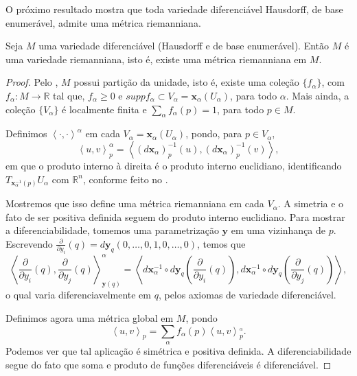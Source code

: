 O próximo resultado mostra que toda variedade diferenciável Hausdorff, de base enumerável, admite uma métrica riemanniana.
\begin{theorem}
	\label{teo:existencia-metrica}
	Seja $M$ uma variedade diferenciável (Hausdorff e de base enumerável). Então $M$ é uma variedade riemanniana, isto é, existe uma métrica riemanniana em $M$.
	\begin{proof}

		Pelo , $M$ possui partição da unidade, isto é, existe uma coleção $\{ f_{\alpha} \}$, com $f_{\alpha}:M\to \mathbb{R}$ tal que, $f_{\alpha}\geq0$ e $suppf_{\alpha}\subset V_{\alpha}=\mathbf{x}_{\alpha}(U_{\alpha})$, para todo $\alpha$. Mais ainda, a coleção $\{ V_{\alpha} \}$ é localmente finita e $\sum_{\alpha}f_{\alpha}(p)=1$, para todo $p \in M$.

		Definimos $\left<\cdot,\cdot\right>^{\alpha}$ em cada $V_{\alpha}=\mathbf{x}_{\alpha}(U_{\alpha})$, pondo, para $p \in V_{\alpha}$,
		\begin{equation*}
			\left<u,v\right>_{p}^{\alpha}=\left<(d\mathbf{x}_{\alpha})_{p}^{-1}(u),(d\mathbf{x}_{\alpha})_{p}^{-1}(v)\right>,
		\end{equation*}
		em que o produto interno à direita é o produto interno euclidiano, identificando $T_{\mathbf{x}_{\alpha}^{-1}(p)}U_{\alpha}$ com $\mathbb{R}^{n}$, conforme feito no .

		Mostremos que isso define uma métrica riemanniana em cada $V_{\alpha}$.
		A simetria e o fato de ser positiva definida seguem do produto interno euclidiano. Para mostrar a diferenciabilidade, tomemos uma parametrização $\mathbf{y}$ em uma vizinhança de $p$. Escrevendo $\frac{\partial}{\partial y_{i}}(q)=d\mathbf{y}_{q}(0, \dots, 0, 1, 0, \dots, 0)$, temos que
		\begin{equation*}
			\left<\frac{\partial}{\partial y_{i}}(q),\frac{\partial}{\partial y_{j}}(q)\right>_{\mathbf{y}(q)}^{\alpha}=\left<d\mathbf{x}_{\alpha}^{-1} \circ d\mathbf{y}_{q}\left(\frac{\partial}{\partial y_{i}}(q)\right),d\mathbf{x}_{\alpha}^{-1} \circ d\mathbf{y}_{q}\left(\frac{\partial}{\partial y_{j}}(q)\right)\right>,
		\end{equation*}
		o qual varia diferenciavelmente em $q$, pelos axiomas de variedade diferenciável.

		Definimos agora uma métrica global em $M$, pondo
		\begin{equation*}
			\left<u,v\right>_{p}=\sum_{\alpha}f_{\alpha}(p)\left<u,v\right>_{p}^{_{\alpha}}.
		\end{equation*}
		Podemos ver que tal aplicação é simétrica e positiva definida. A diferenciabilidade segue do fato que soma e produto de funções diferenciáveis é diferenciável.
	\end{proof}
\end{theorem}
